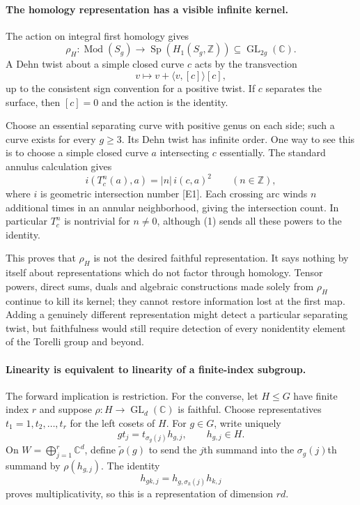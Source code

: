 \documentclass[11pt]{article}
\begin{document}
\paragraph{The homology representation has a visible infinite kernel.}
The action on integral first homology gives
\[
 \rho_H:\operatorname{Mod}(S_g)\longrightarrow
 \operatorname{Sp}(H_1(S_g,\mathbb Z))\subseteq\operatorname{GL}_{2g}(\mathbb C).
\]
A Dehn twist about a simple closed curve $c$ acts by the transvection
\[
 v\longmapsto v+\langle v,[c]\rangle[c],                    \tag{1}
\]
up to the consistent sign convention for a positive twist. If $c$ separates the surface, then $[c]=0$ and the action is the identity.

Choose an essential separating curve with positive genus on each side; such a curve exists for every $g\ge3$. Its Dehn twist has infinite order. One way to see this is to choose a simple closed curve $a$ intersecting $c$ essentially. The standard annulus calculation gives
\[
 i(T_c^n(a),a)=|n|\,i(c,a)^2\qquad(n\in\mathbb Z),          \tag{2}
\]
where $i$ is geometric intersection number [E1]. Each crossing arc winds $n$ additional times in an annular neighborhood, giving the intersection count. In particular $T_c^n$ is nontrivial for $n\ne0$, although (1) sends all these powers to the identity.

This proves that $\rho_H$ is not the desired faithful representation. It says nothing by itself about representations which do not factor through homology. Tensor powers, direct sums, duals and algebraic constructions made solely from $\rho_H$ continue to kill its kernel; they cannot restore information lost at the first map. Adding a genuinely different representation might detect a particular separating twist, but faithfulness would still require detection of every nonidentity element of the Torelli group and beyond.

\paragraph{Linearity is equivalent to linearity of a finite-index subgroup.}
The forward implication is restriction. For the converse, let $H\le G$ have finite index $r$ and suppose $\rho:H\to\operatorname{GL}_d(\mathbb C)$ is faithful. Choose representatives $t_1=1,t_2,\ldots,t_r$ for the left cosets of $H$. For $g\in G$, write uniquely
\[
 gt_j=t_{\sigma_g(j)}h_{g,j},\qquad h_{g,j}\in H.
\]
On $W=\bigoplus_{j=1}^r\mathbb C^d$, define $\widetilde\rho(g)$ to send the $j$th summand into the $\sigma_g(j)$th summand by $\rho(h_{g,j})$. The identity
\[
 h_{gk,j}=h_{g,\sigma_k(j)}h_{k,j}
\]
proves multiplicativity, so this is a representation of dimension $rd$.
\end{document}
